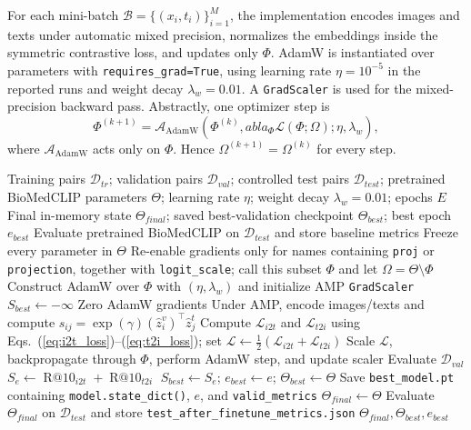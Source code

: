 \documentclass[runningheads]{llncs}
\begin{document}
For each mini-batch $\mathcal{B}=\{(x_i,t_i)\}_{i=1}^{M}$, the implementation encodes images and texts under automatic mixed precision, normalizes the embeddings inside the symmetric contrastive loss, and updates only $\Phi$. AdamW is instantiated over parameters with \texttt{requires\_grad=True}, using learning rate $\eta=10^{-5}$ in the reported runs and weight decay $\lambda_w=0.01$. A \texttt{GradScaler} is used for the mixed-precision backward pass. Abstractly, one optimizer step is
\begin{equation}
\Phi^{(k+1)}=\mathcal{A}_{\mathrm{AdamW}}\!\left(\Phi^{(k)},
abla_{\Phi}\mathcal{L}(\Phi;\Omega);\eta,\lambda_w\right),
\end{equation}
where $\mathcal{A}_{\mathrm{AdamW}}$ acts only on $\Phi$. Hence $\Omega^{(k+1)}=\Omega^{(k)}$ for every step.


\begin{algorithm}[t]
\caption{Preserved-code projection-related adaptation and checkpoint selection}
\label{alg:projection}
\footnotesize
\begin{algorithmic}[1]
\Require Training pairs $\mathcal{D}_{tr}$; validation pairs $\mathcal{D}_{val}$; controlled test pairs $\mathcal{D}_{test}$; pretrained BioMedCLIP parameters $\Theta$; learning rate $\eta$; weight decay $\lambda_w=0.01$; epochs $E$
\Ensure Final in-memory state $\Theta_{final}$; saved best-validation checkpoint $\Theta_{best}$; best epoch $e_{best}$
\State Evaluate pretrained BioMedCLIP on $\mathcal{D}_{test}$ and store baseline metrics
\State Freeze every parameter in $\Theta$
\State Re-enable gradients only for names containing \texttt{proj} or \texttt{projection}, together with \texttt{logit\_scale}; call this subset $\Phi$ and let $\Omega=\Theta\setminus\Phi$
\State Construct AdamW over $\Phi$ with $(\eta,\lambda_w)$ and initialize AMP \texttt{GradScaler}
\State $S_{best}\leftarrow-\infty$
        \State Zero AdamW gradients
        \State Under AMP, encode images/texts and compute $s_{ij}=\exp(\gamma)(\hat z_i^v)^\top\hat z_j^t$
        \State Compute $\mathcal{L}_{i2t}$ and $\mathcal{L}_{t2i}$ using Eqs.~(\ref{eq:i2t_loss})--(\ref{eq:t2i_loss}); set $\mathcal L\leftarrow\tfrac12(\mathcal{L}_{i2t}+\mathcal{L}_{t2i})$
        \State Scale $\mathcal L$, backpropagate through $\Phi$, perform AdamW step, and update scaler
    \EndFor
    \State Evaluate $\mathcal{D}_{val}$
    \State $S_e\leftarrow \operatorname{R@10}_{i2t}+\operatorname{R@10}_{t2i}$
        \State $S_{best}\leftarrow S_e$; $e_{best}\leftarrow e$; $\Theta_{best}\leftarrow\Theta$
        \State Save \texttt{best\_model.pt} containing \texttt{model.state\_dict()}, $e$, and \texttt{valid\_metrics}
    \EndIf
\EndFor
\State $\Theta_{final}\leftarrow\Theta$
\State Evaluate $\Theta_{final}$ on $\mathcal{D}_{test}$ and store \texttt{test\_after\_finetune\_metrics.json}
\State \Return $\Theta_{final},\Theta_{best},e_{best}$
\end{algorithmic}
\end{algorithm}
\end{document}
